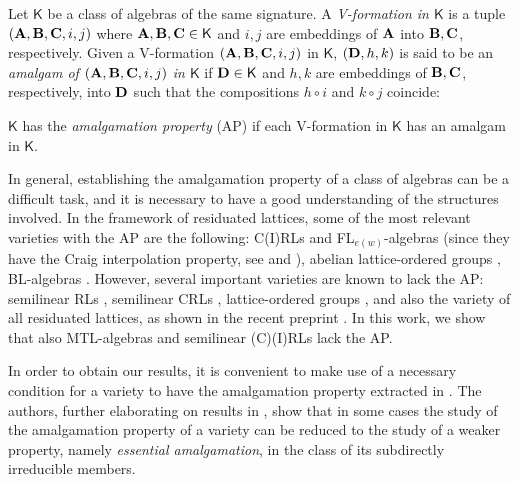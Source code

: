 \documentclass{amsart}
\theoremstyle{definition}
\numberwithin{equation}{section}
\newcommand{\alg}[1]{{\textbf{\upshape #1}}}  %
\newcommand{\vv}[1]{\mathsf {#1}}
\begin{document}
Let $\vv K$ be a class of algebras of the same signature. A {\em V-formation in $\vv K$} is a tuple $(\alg A, \alg B,\alg C,i,j)$ where $\alg A, \alg B, \alg C \in \vv K$ and $i,j$ are embeddings of $\alg A$ into $\alg B,\alg C$, respectively. Given a V-formation $(\alg A, \alg B,\alg C,i,j)$ in $\vv K$, $(\alg D,h,k)$ is said to be an \emph{amalgam of $(\alg A, \alg B,\alg C,i,j)$ in $\vv K$} if $\alg D \in \vv K$ and $h, k$ are embeddings of $\alg B, \alg C$, respectively, into $\alg D$ such that the compositions $h \circ i$ and $k\circ j$ coincide: 
\begin{figure}[h!]
\begin{center}
\end{center} \end{figure}
 
$\vv K$ has the {\em amalgamation property} (AP) if each V-formation in $\vv K$ has an amalgam in $\vv K$.

In general, establishing the amalgamation property of a class of algebras can be a difficult task, and it is necessary to have a good understanding of the structures involved. In the framework of residuated lattices, some of the most relevant varieties with the AP are the following: C(I)RLs and FL$_{e(w)}$-algebras (since they have the Craig interpolation property, see \cite{Ono} and \cite[Lemma 8.4.2, Theorem 8.4.3]{MPT2023}), abelian lattice-ordered groups \cite{Pierce}, BL-algebras \cite{Montagna06}. However, several important varieties are known to lack the AP: semilinear RLs \cite{GilferezLeddaTsinakis2015}, semilinear CRLs \cite{FussnerSantschi24}, lattice-ordered groups \cite{Pierce}, and also the variety of all residuated lattices, as shown in the recent preprint \cite{JipsenSantschi}. In this work, we show that also MTL-algebras and semilinear (C)(I)RLs lack the AP.


In order to obtain our results, it is convenient to make use of a necessary condition for a variety to have the amalgamation property extracted in \cite{FussnerSantschi24}. The authors, further elaborating on results in \cite{MMT2014,FussnerMetcalfe2024}, show that in some cases the study of the amalgamation property of a variety can be reduced to the study of a weaker property, namely {\em essential amalgamation}, in the class of its subdirectly irreducible members.
\end{document}
